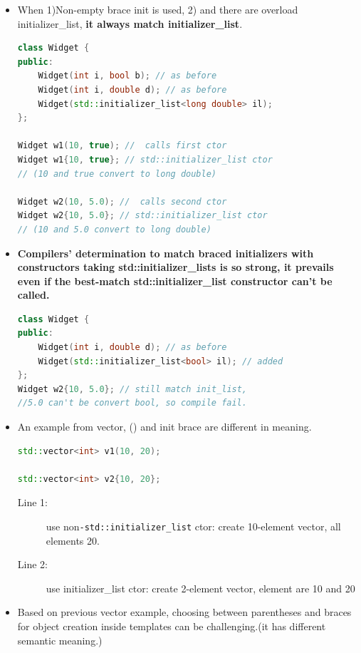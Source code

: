 \documentclass[a4paper,11pt,twoside]{book}
\begin{document}
\begin{itemize}

	\item When 1)Non-empty brace init is used, 2) and there are overload initializer\_list, \textbf{it always match initializer\_list}.
\begin{lstlisting}[frame=single, language=c++,mathescape=true]
class Widget {
public:
	Widget(int i, bool b); // as before
	Widget(int i, double d); // as before
	Widget(std::initializer_list<long double> il);
};
	
Widget w1(10, true); //  calls first ctor
Widget w1{10, true}; // std::initializer_list ctor
// (10 and true convert to long double)

Widget w2(10, 5.0); //  calls second ctor
Widget w2{10, 5.0}; // std::initializer_list ctor
// (10 and 5.0 convert to long double)
\end{lstlisting}
	
	\item \textbf{ Compilers' determination to match braced initializers with constructors taking std::initializer\_lists is so strong, it prevails even if the best-match std::initializer\_list constructor can't be called.}
\begin{lstlisting}[frame=single, language=c++,mathescape=true]
class Widget {
public:
	Widget(int i, double d); // as before
	Widget(std::initializer_list<bool> il); // added
};
Widget w2{10, 5.0}; // still match init_list,
//5.0 can't be convert bool, so compile fail.
\end{lstlisting}
	
	\item An example from vector, () and init brace are different in meaning.
\begin{lstlisting}[frame=single, language=c++,mathescape=true]
std::vector<int> v1(10, 20); 
	
std::vector<int> v2{10, 20}; 
\end{lstlisting}
\begin{description}
	\item[Line 1:] use non\texttt{-std::initializer\_list} ctor: create 10-element vector, all elements 20.
	\item[Line 2:] use initializer\_list ctor: create 2-element vector, element are 10 and 20
\end{description}
	
	\item Based on previous vector example, choosing between parentheses and braces for object creation inside templates can be challenging.(it has different semantic meaning.)
\end{itemize}
\end{document}
